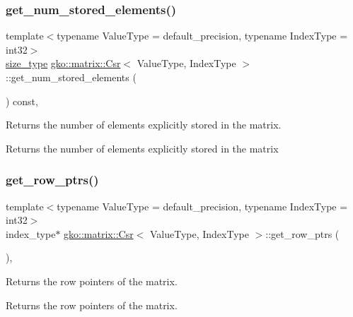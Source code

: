 \subsubsection{\texorpdfstring{get\+\_\+num\+\_\+stored\+\_\+elements()}{get\_num\_stored\_elements()}}
{\footnotesize\ttfamily template$<$typename Value\+Type = default\+\_\+precision, typename Index\+Type = int32$>$ \\
\hyperlink{namespacegko_a6e5c95df0ae4e47aab2f604a22d98ee7}{size\+\_\+type} \hyperlink{classgko_1_1matrix_1_1Csr}{gko\+::matrix\+::\+Csr}$<$ Value\+Type, Index\+Type $>$\+::get\+\_\+num\+\_\+stored\+\_\+elements (\begin{DoxyParamCaption}{ }\end{DoxyParamCaption}) const\hspace{0.3cm}{\ttfamily [inline]}, {\ttfamily [noexcept]}}



Returns the number of elements explicitly stored in the matrix. 

\begin{DoxyReturn}{Returns}
the number of elements explicitly stored in the matrix 
\end{DoxyReturn}
\mbox{\label{classgko_1_1matrix_1_1Csr_a068e5158cf282fa977f0a137f8cd7f03}} 
\subsubsection{\texorpdfstring{get\+\_\+row\+\_\+ptrs()}{get\_row\_ptrs()}}
{\footnotesize\ttfamily template$<$typename Value\+Type = default\+\_\+precision, typename Index\+Type = int32$>$ \\
index\+\_\+type$\ast$ \hyperlink{classgko_1_1matrix_1_1Csr}{gko\+::matrix\+::\+Csr}$<$ Value\+Type, Index\+Type $>$\+::get\+\_\+row\+\_\+ptrs (\begin{DoxyParamCaption}{ }\end{DoxyParamCaption})\hspace{0.3cm}{\ttfamily [inline]}, {\ttfamily [noexcept]}}



Returns the row pointers of the matrix. 

\begin{DoxyReturn}{Returns}
the row pointers of the matrix. 
\end{DoxyReturn}
\mbox{\label{classgko_1_1matrix_1_1Csr_a919fb1efdcbde6fba7eb18bdc39ba46a}} 
